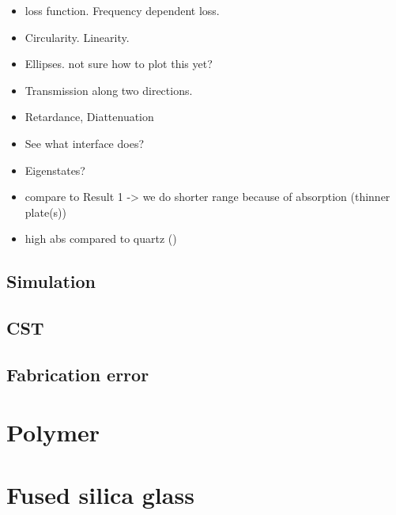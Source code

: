 \begin{table}[h]
    \centering
    
    \caption{}
    \label{tab:ceramic_result_l4}
\end{table}

\begin{itemize}
    \item loss function. Frequency dependent loss.
    \item Circularity. Linearity.
    \item Ellipses. not sure how to plot this yet?
    \item Transmission along two directions.
    \item Retardance, Diattenuation
    \item See what interface does?
    \item Eigenstates?
    \item compare to Result 1 -> we do shorter range because of absorption (thinner plate(s))
    \item high abs compared to quartz (\cite{DGrischkowsky1990})
\end{itemize}

\subsection{Simulation}
\subsection{CST}
\subsection{Fabrication error}

\section{Polymer}

\section{Fused silica glass}



